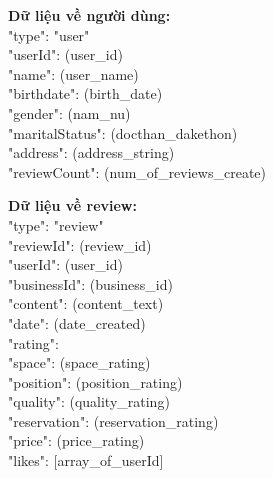 \documentclass[12pt]{extarticle}
\begin{document}
			\par \textbf{Dữ liệu về người dùng:}\\
				"type": "user"\\
				"userId": (user\_id)\\
				"name": (user\_name)\\
				"birthdate": (birth\_date)\\
				"gender": (nam\_nu)\\
				"maritalStatus": (docthan\_dakethon)\\
				"address": (address\_string)\\
				"reviewCount": (num\_of\_reviews\_create)\\

			\par \textbf{Dữ liệu về review:}\\
				"type": "review"\\
				"reviewId": (review\_id)\\
				"userId": (user\_id)\\
				"businessId": (business\_id)\\
				"content": (content\_text)\\
				"date": (date\_created)\\
				"rating":\\
				\hspace*{1.5cm}"space": (space\_rating)\\
				\hspace*{1.5cm}"position": (position\_rating)\\
				\hspace*{1.5cm}"quality": (quality\_rating)\\
				\hspace*{1.5cm}"reservation": (reservation\_rating)\\
				\hspace*{1.5cm}"price": (price\_rating)\\		
				"likes": [array\_of\_userId]
					
\end{document}
